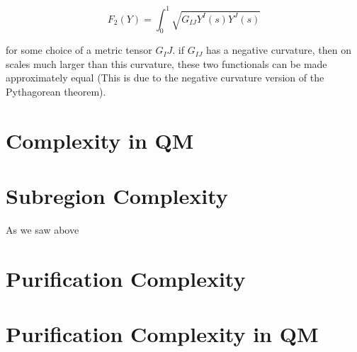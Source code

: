 \documentclass[12pt]{amsart}
\begin{document}
$$F_2(Y) = \int_0^1 \sqrt{G_{IJ} Y^I(s) Y^J(s)}$$

for some choice of a metric tensor $G_IJ$. if $G_{IJ}$ has a negative curvature, then on scales much larger than this curvature, these two functionals can be made approximately equal (This is due to the negative curvature version of the Pythagorean theorem).

\section{Complexity in QM}

\section{Subregion Complexity}

As we saw above

\section{Purification Complexity}

\section{Purification Complexity in QM}

%

\nocite{*}
\end{document}
